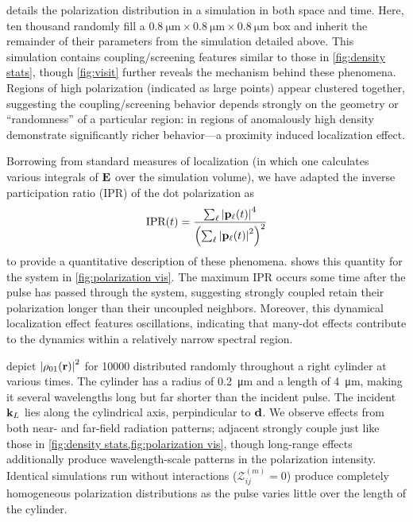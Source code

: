  details the polarization distribution in a simulation in both space and time.
Here, ten thousand \qds{} randomly fill a $\SI{0.8}{\micro\meter} \times \SI{0.8}{\micro\meter} \times \SI{0.8}{\micro\meter}$ box and inherit the remainder of their parameters from the simulation detailed above.
This simulation contains coupling/screening features similar to those in \cref{fig:density stats},
though \cref{fig:visit} further reveals the mechanism behind these phenomena.
Regions of high polarization (indicated as large points) appear clustered together, suggesting the coupling/screening behavior depends strongly on the geometry or ``randomness'' of a particular region: \qds{} in regions of anomalously high density demonstrate significantly richer behavior---a proximity induced localization effect.

Borrowing from standard measures of localization (in which one calculates various integrals of $\vb{E}$ over the simulation volume), we have adapted the inverse participation ratio (IPR)  of the dot polarization as
\begin{equation}
  \text{IPR}(t) = \frac{\sum_\ell \abs{\vb{p}_\ell(t)}^4}{\qty(\sum_\ell \abs{\vb{p}_\ell(t)}^2)^2}
  \label{eq:ipr}
\end{equation}
to provide a quantitative description of these phenomena.
 shows this quantity for the system in \cref{fig:polarization vis}.
The maximum IPR occurs some time after the pulse has passed through the system, suggesting strongly coupled \qds{} retain their polarization longer than their uncoupled neighbors. Moreover, this dynamical localization effect features oscillations, indicating that many-dot effects contribute to the dynamics within a relatively narrow spectral region.

 depict $\abs{\rho_{01}(\vb{r})}^2$ for \num{10000} \qds{} distributed randomly throughout a right cylinder at various times.
The cylinder has a radius of \SI{0.2}{\micro\meter} and a length of \SI{4}{\micro\meter}, making it several wavelengths long but far shorter than the incident pulse.
The incident $\vb{k}_L$ lies along the cylindrical axis, perpindicular to $\vb{d}$.
We observe effects from both near- and far-field radiation patterns; adjacent \qds{} strongly couple just like those in \cref{fig:density stats,fig:polarization vis}, though long-range effects additionally produce wavelength-scale patterns in the polarization intensity.
Identical simulations run without interactions ($\mathcal{Z}^{(m)}_{ij} = 0$) produce completely homogeneous polarization distributions as the pulse varies little over the length of the cylinder.

